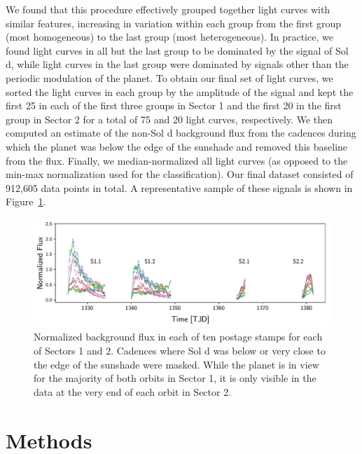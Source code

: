 \documentclass[modern]{aastex62}
\begin{document}
We found that this
procedure effectively grouped together light curves with similar features,
increasing in variation within each group from the first group (most homogeneous) 
to the last group (most heterogeneous). In practice, we found light curves
in all but the last group to be dominated by 
the signal of Sol d, while light
curves in the last group were dominated by signals other than the
periodic modulation of the planet. To obtain our final set of light curves, 
we sorted the light curves in each group by the amplitude
of the signal and kept the first 25 in each of the first three groups in Sector 1
and the first 20 in the first group in Sector 2 for a total
of 75 and 20 light curves, respectively. We then computed an estimate of the
non-Sol d background flux from the cadences during which the planet was below
the edge of the sunshade and removed this baseline from the flux.
Finally, we median-normalized all light curves (as opposed to the min-max
normalization used for the classification).
Our final dataset consisted of 912,605 data points in total. 
A representative sample of these signals is shown in Figure~\ref{fig:data}.

\begin{figure}[t!]
    \begin{centering}
    \includegraphics[width=\linewidth]{figures/data.pdf}
    \caption{\label{fig:data}
             Normalized background flux in each of ten postage stamps
             for each of Sectors 1 and 2. Cadences where Sol d was
             below or very close to the edge of the sunshade were masked.
             While the planet is in view for the majority of both orbits
             in Sector 1, it is only visible in the data at the very end
             of each orbit in Sector 2.
             }
    \end{centering}
\end{figure}

\section{Methods}
\label{sec:methods}
\end{document}
